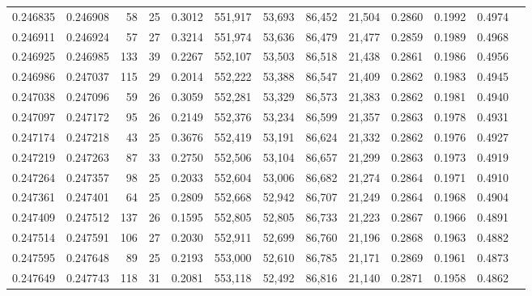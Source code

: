 \begin{tabular}{rrrrrrrrrrrrr}
0.246835 & 0.246908 &  58 &  25 &                                     0.3012 & 551,917 &  53,693 &  86,452 &  21,504 & 0.2860 & 0.1992 & 0.4974 \\
0.246911 & 0.246924 &  57 &  27 &                                     0.3214 & 551,974 &  53,636 &  86,479 &  21,477 & 0.2859 & 0.1989 & 0.4968 \\
0.246925 & 0.246985 & 133 &  39 &                                     0.2267 & 552,107 &  53,503 &  86,518 &  21,438 & 0.2861 & 0.1986 & 0.4956 \\
0.246986 & 0.247037 & 115 &  29 &                                     0.2014 & 552,222 &  53,388 &  86,547 &  21,409 & 0.2862 & 0.1983 & 0.4945 \\
0.247038 & 0.247096 &  59 &  26 &                                     0.3059 & 552,281 &  53,329 &  86,573 &  21,383 & 0.2862 & 0.1981 & 0.4940 \\
0.247097 & 0.247172 &  95 &  26 &                                     0.2149 & 552,376 &  53,234 &  86,599 &  21,357 & 0.2863 & 0.1978 & 0.4931 \\
0.247174 & 0.247218 &  43 &  25 &                                     0.3676 & 552,419 &  53,191 &  86,624 &  21,332 & 0.2862 & 0.1976 & 0.4927 \\
0.247219 & 0.247263 &  87 &  33 &                                     0.2750 & 552,506 &  53,104 &  86,657 &  21,299 & 0.2863 & 0.1973 & 0.4919 \\
0.247264 & 0.247357 &  98 &  25 &                                     0.2033 & 552,604 &  53,006 &  86,682 &  21,274 & 0.2864 & 0.1971 & 0.4910 \\
0.247361 & 0.247401 &  64 &  25 &                                     0.2809 & 552,668 &  52,942 &  86,707 &  21,249 & 0.2864 & 0.1968 & 0.4904 \\
0.247409 & 0.247512 & 137 &  26 &                                     0.1595 & 552,805 &  52,805 &  86,733 &  21,223 & 0.2867 & 0.1966 & 0.4891 \\
0.247514 & 0.247591 & 106 &  27 &                                     0.2030 & 552,911 &  52,699 &  86,760 &  21,196 & 0.2868 & 0.1963 & 0.4882 \\
0.247595 & 0.247648 &  89 &  25 &                                     0.2193 & 553,000 &  52,610 &  86,785 &  21,171 & 0.2869 & 0.1961 & 0.4873 \\
0.247649 & 0.247743 & 118 &  31 &                                     0.2081 & 553,118 &  52,492 &  86,816 &  21,140 & 0.2871 & 0.1958 & 0.4862 \\

\end{tabular}
